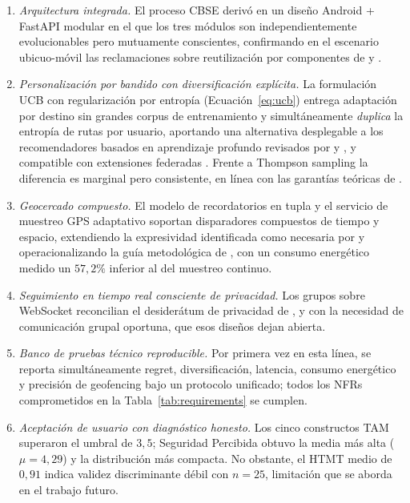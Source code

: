 \documentclass[a4paper,fleqn]{cas-sc}
\newcommand{\UCB}{UCB\xspace}
\newcommand{\TAM}{TAM\xspace}
\newcommand{\CBSE}{CBSE\xspace}
\begin{document}
	\begin{enumerate}
		\item \emph{Arquitectura integrada.} El proceso \CBSE deriv\'o en un dise\~no Android + FastAPI modular en el que los tres m\'odulos son independientemente evolucionables pero mutuamente conscientes, confirmando en el escenario ubicuo-m\'ovil las reclamaciones sobre reutilizaci\'on por componentes de \citet{khan2022cbse} y \citet{coullon2024cbse}.
		\item \emph{Personalizaci\'on por bandido con diversificaci\'on expl\'icita.} La formulaci\'on \UCB con regularizaci\'on por entrop\'ia (Ecuaci\'on~\ref{eq:ucb}) entrega adaptaci\'on por destino sin grandes corpus de entrenamiento y simult\'aneamente \emph{duplica} la entrop\'ia de rutas por usuario, aportando una alternativa desplegable a los recomendadores basados en aprendizaje profundo revisados por \citet{yuan2022mlits} y \citet{liu2022multimodal}, y compatible con extensiones federadas \citep{shi2021fedmab}. Frente a Thompson sampling \citep{chapelle2011thompson} la diferencia es marginal pero consistente, en l\'inea con las garant\'ias te\'oricas de \citet{auer2002ucb}.
		\item \emph{Geocercado compuesto.} El modelo de recordatorios en tupla y el servicio de muestreo GPS adaptativo soportan disparadores compuestos de tiempo y espacio, extendiendo la expresividad identificada como necesaria por \citet{wang2015beyond} y operacionalizando la gu\'ia metodol\'ogica de \citet{shevchenko2024geofencing}, con un consumo energ\'etico medido un $57{,}2\%$ inferior al del muestreo continuo.
		\item \emph{Seguimiento en tiempo real consciente de privacidad.} Los grupos sobre WebSocket reconcilian el desider\'atum de privacidad de \citet{li2017locsharing}, \citet{shokri2014mobicrowd} y \citet{mckenzie2022privyto} con la necesidad de comunicaci\'on grupal oportuna, que esos dise\~nos dejan abierta.
		\item \emph{Banco de pruebas t\'ecnico reproducible.} Por primera vez en esta l\'inea, se reporta simult\'aneamente regret, diversificaci\'on, latencia, consumo energ\'etico y precisi\'on de geofencing bajo un protocolo unificado; todos los NFRs comprometidos en la Tabla~\ref{tab:requirements} se cumplen.
		\item \emph{Aceptaci\'on de usuario con diagn\'ostico honesto.} Los cinco constructos \TAM superaron el umbral de $3{,}5$; Seguridad Percibida obtuvo la media m\'as alta ($\mu=4{,}29$) y la distribuci\'on m\'as compacta. No obstante, el HTMT medio de $0{,}91$ indica validez discriminante d\'ebil con $n=25$, limitaci\'on que se aborda en el trabajo futuro.
	\end{enumerate}
	
\end{document}

